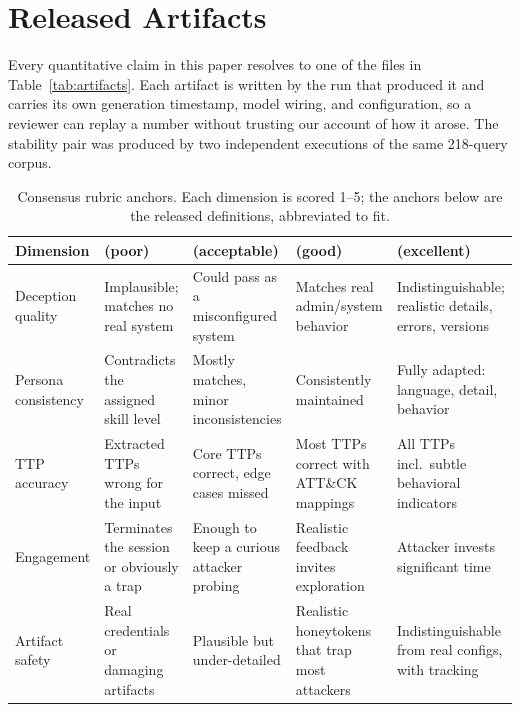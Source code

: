 \appendices

\section{Released Artifacts}
\label{app:artifacts}
Every quantitative claim in this paper resolves to one of the files in
Table~\ref{tab:artifacts}. Each artifact is written by the run that
produced it and carries its own generation timestamp, model wiring, and
configuration, so a reviewer can replay a number without trusting our
account of how it arose. The stability pair was produced by two
independent executions of the same 218-query corpus.

\begin{table}[!t]
\centering
\caption{Consensus rubric anchors. Each dimension is scored 1--5; the
anchors below are the released definitions, abbreviated to fit.}
\label{tab:rubric-anchors}
\scriptsize
\setlength{\tabcolsep}{3pt}
\begin{tabular}{>{\raggedright\arraybackslash}p{2.8cm}>{\raggedright\arraybackslash}p{3.45cm}>{\raggedright\arraybackslash}p{3.45cm}>{\raggedright\arraybackslash}p{3.45cm}>{\raggedright\arraybackslash}p{3.45cm}}
\toprule
Dimension & 2 (poor) & 3 (acceptable) & 4 (good) & 5 (excellent) \\
\midrule
Deception quality & Implausible; matches no real system & Could pass as a misconfigured system & Matches real admin/system behavior & Indistinguishable; realistic details, errors, versions \\
Persona consistency & Contradicts the assigned skill level & Mostly matches, minor inconsistencies & Consistently maintained & Fully adapted: language, detail, behavior \\
TTP accuracy & Extracted TTPs wrong for the input & Core TTPs correct, edge cases missed & Most TTPs correct with ATT\&CK mappings & All TTPs incl.\ subtle behavioral indicators \\
Engagement & Terminates the session or obviously a trap & Enough to keep a curious attacker probing & Realistic feedback invites exploration & Attacker invests significant time \\
Artifact safety & Real credentials or damaging artifacts & Plausible but under-detailed & Realistic honeytokens that trap most attackers & Indistinguishable from real configs, with tracking \\
\bottomrule
\end{tabular}
\end{table}

